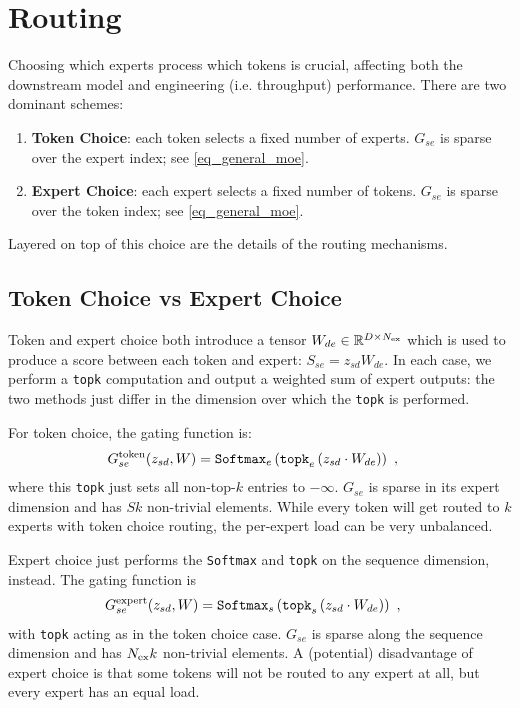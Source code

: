\section{Routing}


Choosing which experts process which tokens is crucial, affecting both the downstream model and
engineering (i.e. throughput) performance.  There are two dominant schemes:
\begin{enumerate}
    \item \textbf{Token Choice}: each token selects a fixed number of experts. $ G _{ se } $
         is sparse over the expert index; see \eqref{eq_general_moe}.
    \item \textbf{Expert Choice}: each expert selects a fixed number of tokens. $ G _{ se } $ is
        sparse over the token index; see \eqref{eq_general_moe}.
\end{enumerate}
Layered on top of this choice are the details of the routing mechanisms.

\subsection{Token Choice vs Expert Choice}

Token and expert choice both introduce a tensor $W _{ de } \in \mathbb{R} ^{ D\times N _{ {\rm  ex}
} }$ which is used to produce a score between each token and expert: $ S _{ se } = z _{ sd } W _{ de
} $. In each case, we perform a \texttt{topk} computation and output a weighted sum of expert
outputs: the two methods just differ in the dimension over which the \texttt{topk} is performed.

For token choice, the gating function is:
\begin{align}
    G  ^{ {\rm  token} }_{ se }(z _{ sd }, W)  &= \texttt{Softmax}_{ e } \left ( \texttt{topk} _{ e } \left ( z _{ sd } \cdot W _{ de }  \right ) \right ) \ , \label{eq_token_choice}
\end{align}
where this \texttt{topk} just sets all non-top-$ k $ entries to $ -\infty $. $ G _{ se } $
is sparse in its expert dimension and has $ Sk $ non-trivial elements. While every token will get
routed to $ k $ experts with token choice routing, the per-expert load can be very unbalanced.

Expert choice just performs the \texttt{Softmax} and \texttt{topk} on the sequence dimension,
instead.  The gating function is
\begin{align}
    G  ^{ {\rm  expert} }_{ se }(z _{ sd }, W)  &= \texttt{Softmax}_{ s } \left ( \texttt{topk} _{ s } \left ( z _{ sd } \cdot W _{ de }  \right ) \right ) \ , \label{eq_expert_choice}
\end{align}
with \texttt{topk} acting as in the token choice case. $G _{ se } $ is sparse along the sequence
dimension and has $ N _{ {\rm ex} }k $ non-trivial elements. A (potential) disadvantage of expert
choice is that some tokens will not be routed to any expert at all, but every expert has an equal
load.


